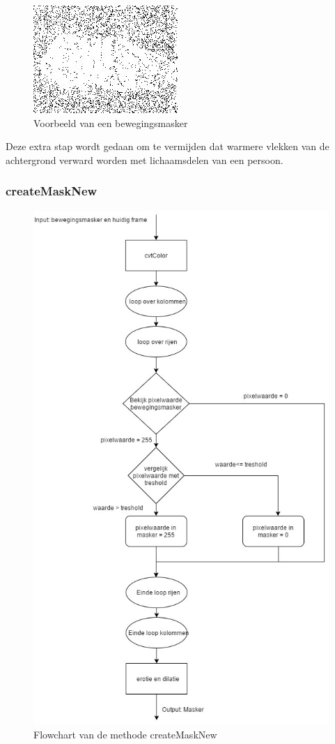 \begin{figure}[h]
	\includegraphics[scale=0.75]{bewegingsMatrix}
	\caption{Voorbeeld van een bewegingsmasker}
	\label{imgBMa}
\end{figure}
Deze extra stap wordt gedaan om te vermijden dat warmere vlekken van de achtergrond verward worden met lichaamsdelen van een persoon. 

\subsubsection{createMaskNew}
\begin{figure}[h]
	\includegraphics[scale=0.45]{FlowChart_createMaskNew}
	\caption{Flowchart van de methode createMaskNew}
	\label{imgFCCMN}
\end{figure}
